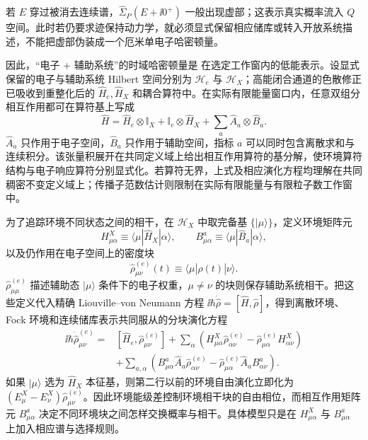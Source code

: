 若 $E$ 穿过被消去连续谱，$\hat\Sigma_P(E+\ii0^+)$ 一般出现虚部；这表示真实概率流入 $Q$ 空间。此时若仍要求迹保持动力学，就必须显式保留相应储库或转入开放系统描述，不能把虚部伪装成一个厄米单电子哈密顿量。



因此，“电子 + 辅助系统”的时域哈密顿量是 在选定工作窗内的低能表示。设显式保留的电子与辅助系统 Hilbert 空间分别为 $\mathcal H_e$ 与 $\mathcal H_X$；高能闭合通道的色散修正已吸收到重整化后的 $\hat H_e,\hat H_X$ 和耦合算符中。在实际有限能量窗口内，任意双组分相互作用都可在算符基上写成
\begin{equation}
{
\hat H
=\hat H_e\otimes\mathbb I_X
+\mathbb I_e\otimes\hat H_X
+\sum_a\hat A_a\otimes\hat B_a .}
\label{eq:general_bipartite_hamiltonian}
\end{equation}
$\hat A_a$ 只作用于电子空间，$\hat B_a$ 只作用于辅助空间，指标 $a$ 可以同时包含离散求和与连续积分。该张量积展开在共同定义域上给出相互作用算符的基分解，使环境算符结构与电子响应算符分别显式化。若算符无界，上式及相应演化方程均理解在共同稠密不变定义域上；传播子范数估计则限制在实际有限能量与有限粒子数工作窗中。

为了追踪环境不同状态之间的相干，在 $\mathcal H_X$ 中取完备基 $\{|\mu\rangle\}$，定义环境矩阵元
\begin{equation*}
H^X_{\mu\alpha}\equiv\langle\mu|\hat H_X|\alpha\rangle,
\qquad
B^a_{\mu\alpha}\equiv\langle\mu|\hat B_a|\alpha\rangle,
\end{equation*}
以及仍作用在电子空间上的密度块
\begin{equation*}
\hat\rho^{(e)}_{\mu\nu}(t)
\equiv\langle\mu|\hat\rho(t)|\nu\rangle .
\end{equation*}
$\hat\rho^{(e)}_{\mu\mu}$ 描述辅助态 $|\mu\rangle$ 条件下的电子权重，$\mu\neq\nu$ 的块则保存辅助系统相干。把这些定义代入精确 Liouville--von Neumann 方程 $\ii\hbar\dot{\hat\rho}=[\hat H,\hat\rho]$，得到离散环境、Fock 环境和连续储库表示共同服从的分块演化方程
\begin{equation}
{
\begin{aligned}
\ii\hbar\dot{\hat\rho}^{(e)}_{\mu\nu}
={}&[\hat H_e,\hat\rho^{(e)}_{\mu\nu}]
+\sum_\alpha\left(
H^X_{\mu\alpha}\hat\rho^{(e)}_{\alpha\nu}
-\hat\rho^{(e)}_{\mu\alpha}H^X_{\alpha\nu}
\right)\\
&+\sum_{a,\alpha}\left(
B^a_{\mu\alpha}\hat A_a\hat\rho^{(e)}_{\alpha\nu}
-\hat\rho^{(e)}_{\mu\alpha}\hat A_a B^a_{\alpha\nu}
\right).
\end{aligned}}
\label{eq:general_bipartite_density_block_equation}
\end{equation}
如果 $|\mu\rangle$ 选为 $\hat H_X$ 本征基，则第二行以前的环境自由演化立即化为 $(E^X_\mu-E^X_\nu)\hat\rho^{(e)}_{\mu\nu}$。因此环境能级差控制环境相干块的自由相位，而相互作用矩阵元 $B^a_{\mu\alpha}$ 决定不同环境块之间怎样交换概率与相干。具体模型只是在 $H^X_{\mu\alpha}$ 与 $B^a_{\mu\alpha}$ 上加入相应谱与选择规则。

